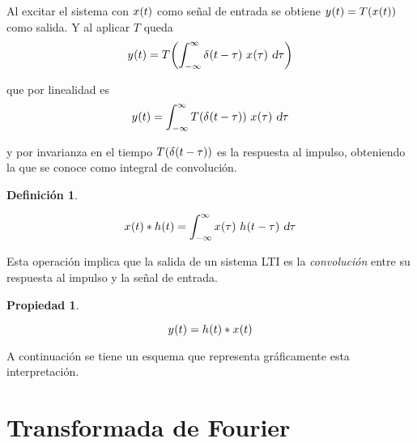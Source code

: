 \documentclass[a5paper,12pt,twoside]{book}
\newtheorem{defn}{{Definición}}[chapter]
\newtheorem{prop}{{Propiedad}}[chapter]
\begin{document}
Al excitar el sistema con $\fx[x]{t}$ como señal de entrada se obtiene $\fx[y]{t} = \fx[T]{\fx[x]{t}}$ como salida. Y al aplicar $T$ queda
\begin{equation*}
    \fx[y]{t} = \fx[T]{ \int_{-\infty}^\infty \fx[\delta]{t-\tau} \, \fx[x]{\tau} \, \dif \tau }
\end{equation*}

que por linealidad es
\begin{equation*}
    \fx[y]{t} = \int_{-\infty}^\infty \fx[T]{\fx[\delta]{t-\tau}} \, \fx[x]{\tau} \, \dif \tau
\end{equation*}

y por invarianza en el tiempo $\fx[T]{\fx[\delta]{t-\tau}}$ es la respuesta al impulso, obteniendo la que se conoce como integral de convolución.

\begin{mdframed}[style=MyFrame1]
    \begin{defn}
    \end{defn}
    \begin{equation*}
        \fx[x]{t} * \fx[h]{t} = \int_{-\infty}^\infty \fx[x]{\tau} \, \fx[h]{t-\tau} \, \dif \tau
    \end{equation*}
\end{mdframed}

Esta operación implica que la salida de un sistema LTI es la \emph{convolución} entre su respuesta al impulso y la señal de entrada.

\begin{mdframed}[style=MyFrame1]
    \begin{prop}
    \end{prop}
    \begin{equation*}
        \fx[y]{t} = \fx[h]{t} * \fx[x]{t}
    \end{equation*}
\end{mdframed}

A continuación se tiene un esquema que representa gráficamente esta interpretación.



\chapter{Transformada de Fourier}
\end{document}
